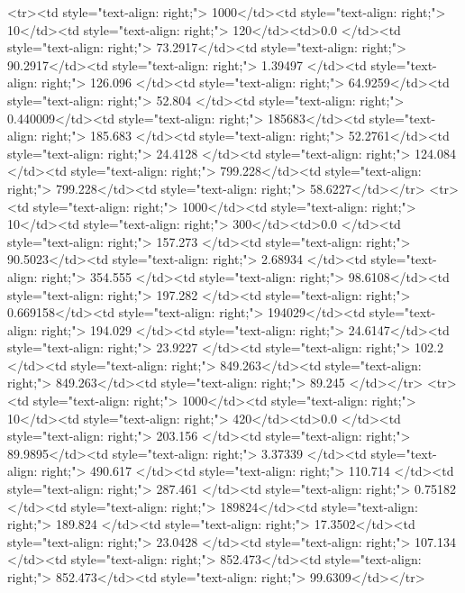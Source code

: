<tr><td style="text-align: right;">      1000</td><td style="text-align: right;">        10</td><td style="text-align: right;">           120</td><td>0.0          </td><td style="text-align: right;">                73.2917</td><td style="text-align: right;">            90.2917</td><td style="text-align: right;">         1.39497 </td><td style="text-align: right;">        126.096 </td><td style="text-align: right;">            64.9259</td><td style="text-align: right;">              52.804   </td><td style="text-align: right;">             0.440009</td><td style="text-align: right;">              185683</td><td style="text-align: right;">                      185.683 </td><td style="text-align: right;">            52.2761</td><td style="text-align: right;">                24.4128 </td><td style="text-align: right;">       124.084 </td><td style="text-align: right;">    799.228</td><td style="text-align: right;">       799.228</td><td style="text-align: right;">                 58.6227</td></tr>
<tr><td style="text-align: right;">      1000</td><td style="text-align: right;">        10</td><td style="text-align: right;">           300</td><td>0.0          </td><td style="text-align: right;">               157.273 </td><td style="text-align: right;">            90.5023</td><td style="text-align: right;">         2.68934 </td><td style="text-align: right;">        354.555 </td><td style="text-align: right;">            98.6108</td><td style="text-align: right;">             197.282   </td><td style="text-align: right;">             0.669158</td><td style="text-align: right;">              194029</td><td style="text-align: right;">                      194.029 </td><td style="text-align: right;">            24.6147</td><td style="text-align: right;">                23.9227 </td><td style="text-align: right;">       102.2   </td><td style="text-align: right;">    849.263</td><td style="text-align: right;">       849.263</td><td style="text-align: right;">                 89.245 </td></tr>
<tr><td style="text-align: right;">      1000</td><td style="text-align: right;">        10</td><td style="text-align: right;">           420</td><td>0.0          </td><td style="text-align: right;">               203.156 </td><td style="text-align: right;">            89.9895</td><td style="text-align: right;">         3.37339 </td><td style="text-align: right;">        490.617 </td><td style="text-align: right;">           110.714 </td><td style="text-align: right;">             287.461   </td><td style="text-align: right;">             0.75182 </td><td style="text-align: right;">              189824</td><td style="text-align: right;">                      189.824 </td><td style="text-align: right;">            17.3502</td><td style="text-align: right;">                23.0428 </td><td style="text-align: right;">       107.134 </td><td style="text-align: right;">    852.473</td><td style="text-align: right;">       852.473</td><td style="text-align: right;">                 99.6309</td></tr>
